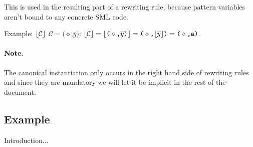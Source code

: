 
This is used in the resulting part of a rewriting rule, because pattern
variables aren't bound to any concrete SML code.

Example: $\lfloor \mathcal{C} \rfloor$ $\mathcal{C} = \texttt{(}\diamond\texttt{,} \overline{y}\texttt{)}$:
$\lfloor \mathcal{C} \rfloor = \lfloor \texttt{(}\diamond\texttt{,} \overline{y}\texttt{)} \rfloor = \texttt{(}\diamond\texttt{,}
\lfloor \overline{y} \rfloor\texttt{)} = \texttt{(}\diamond\texttt{,} \texttt{a)}$.

\paragraph{Note.} The canonical instantiation only occurs in the right hand side
of rewriting rules and since they are mandatory we will let it be implicit in the
rest of the document.

\subsection{Example}

Introduction...

